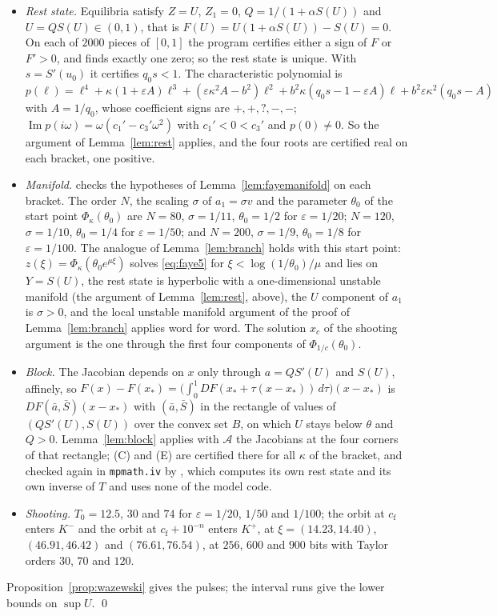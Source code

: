 \documentclass[11pt]{article}
\theoremstyle{definition}
\newcommand{\eps}{\varepsilon}
\newcommand{\im}{\operatorname{Im}}
\newcommand{\xs}{x_*}
\begin{document}
\begin{itemize}
\item \emph{Rest state.} Equilibria satisfy $Z = U$, $Z_1 = 0$, $Q = 1/(1 + \alpha S(U))$ and $U = QS(U) \in (0, 1)$, that is $F(U) = U(1 + \alpha S(U)) - S(U) = 0$. On each of $2000$ pieces of $[0, 1]$ the program certifies either a sign of $F$ or $F' > 0$, and finds exactly one zero; so the rest state is unique. With $s = S'(u_0)$ it certifies $q_0 s < 1$. The characteristic polynomial is $p(\ell) = \ell^4 + \kappa(1 + \eps A)\ell^3 + (\eps\kappa^2 A - b^2)\ell^2 + b^2\kappa(q_0 s - 1 - \eps A)\ell + b^2\eps\kappa^2(q_0 s - A)$ with $A = 1/q_0$, whose coefficient signs are $+, +, ?, -, -$; $\im p(i\omega) = \omega(c_1' - c_3'\omega^2)$ with $c_1' < 0 < c_3'$ and $p(0) \ne 0$. So the argument of Lemma~\ref{lem:rest} applies, and the four roots are certified real on each bracket, one positive.
\item \emph{Manifold.}  checks the hypotheses of Lemma~\ref{lem:fayemanifold} on each bracket. The order $N$, the scaling $\sigma$ of $a_1 = \sigma v$ and the parameter $\theta_0$ of the start point $\Phi_\kappa(\theta_0)$ are $N = 80$, $\sigma = 1/11$, $\theta_0 = 1/2$ for $\eps = 1/20$; $N = 120$, $\sigma = 1/10$, $\theta_0 = 1/4$ for $\eps = 1/50$; and $N = 200$, $\sigma = 1/9$, $\theta_0 = 1/8$ for $\eps = 1/100$. The analogue of Lemma~\ref{lem:branch} holds with this start point: $z(\xi) = \Phi_\kappa(\theta_0e^{\mu\xi})$ solves \eqref{eq:faye5} for $\xi < \log(1/\theta_0)/\mu$ and lies on $Y = S(U)$, the rest state is hyperbolic with a one-dimensional unstable manifold (the argument of Lemma~\ref{lem:rest}, above), the $U$ component of $a_1$ is $\sigma > 0$, and the local unstable manifold argument of the proof of Lemma~\ref{lem:branch} applies word for word. The solution $x_c$ of the shooting argument is the one through the first four components of $\Phi_{1/c}(\theta_0)$.
\item \emph{Block.} The Jacobian depends on $x$ only through $a = QS'(U)$ and $S(U)$, affinely, so $F(x) - F(\xs) = \bigl(\int_0^1 DF(\xs + \tau(x - \xs))\, d\tau\bigr)(x - \xs)$ is $DF(\bar a, \bar S)(x - \xs)$ with $(\bar a, \bar S)$ in the rectangle of values of $(QS'(U), S(U))$ over the convex set $B$, on which $U$ stays below $\theta$ and $Q > 0$. Lemma~\ref{lem:block} applies with $\mathcal{A}$ the Jacobians at the four corners of that rectangle; (C) and (E) are certified there for all $\kappa$ of the bracket, and checked again in \texttt{mpmath.iv} by , which computes its own rest state and its own inverse of $T$ and uses none of the model code.
\item \emph{Shooting.} $T_0 = 12.5$, $30$ and $74$ for $\eps = 1/20$, $1/50$ and $1/100$; the orbit at $c_{\mathrm f}$ enters $K^-$ and the orbit at $c_{\mathrm f} + 10^{-n}$ enters $K^+$, at $\xi = (14.23, 14.40)$, $(46.91, 46.42)$ and $(76.61, 76.54)$, at $256$, $600$ and $900$ bits with Taylor orders $30$, $70$ and $120$.
\end{itemize}
Proposition~\ref{prop:wazewski} gives the pulses; the interval runs give the lower bounds on $\sup U$. \qed
\end{document}
